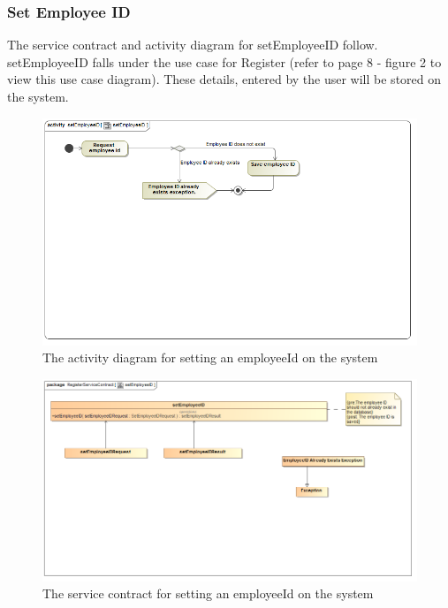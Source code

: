 \documentclass[a4paper,12pt]{article}
\begin{document}
\subsubsection{Set Employee ID }
The service contract and activity diagram for setEmployeeID follow. setEmployeeID falls under the use case for Register (refer to page 8 - figure 2 to view this use case diagram). These details, entered by the user will be stored on the system.
\begin{figure}[H]
  \centering
    \includegraphics[width=1.0\textwidth]{../diagrams/Register/ActivityDiagrams/setEmployeeID1.png}
    \caption{The activity diagram for setting an employeeId on the system} 
\end{figure}
\begin{figure}[H]
  \centering
    \includegraphics[width=1.0\textwidth]{../diagrams/Register/ServiceContractsRegister/setEmployeeIDServiceContract.png}
    \caption{The service contract for setting an employeeId on the system} 
\end{figure}
\end{document}
